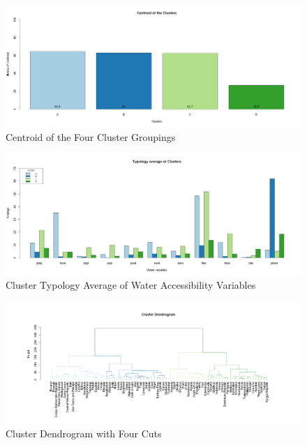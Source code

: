 \documentclass[10pt,twoside]{article}
\numberwithin{equation}{section}
\newcommand{\?}{\stackrel{?}{=}}
\begin{document}
\begin{figure}[h!]
  \centering
  \includegraphics[width=.7\textwidth]{centroid}
  \caption{Centroid of the Four Cluster Groupings}
  \label{fig:centroid}
\end{figure}
\begin{figure}[h!]
  \centering
  \includegraphics[width=1\textwidth]{typology}
  \caption{Cluster Typology Average of Water Accessibility Variables }
  \label{fig:typology}
\end{figure}
\begin{figure}[h!]
\raggedright
  \includegraphics[width=1.15\textwidth]{dendrogram}
  \caption{Cluster Dendrogram with Four Cuts}
  \label{fig:dendrogram}
\end{figure}
\end{document}
